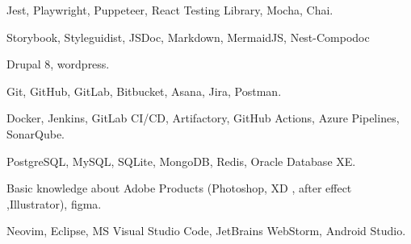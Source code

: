 
\begin{cvparagraph}
  Jest,
  Playwright,
  Puppeteer,
  React Testing Library,
  Mocha,
  Chai.
\end{cvparagraph}


\begin{cvparagraph}
  Storybook,
  Styleguidist,
  JSDoc,
  Markdown,
  MermaidJS,
  Nest-Compodoc
\end{cvparagraph}


\begin{cvparagraph}
  Drupal 8,
  wordpress.
\end{cvparagraph}


\begin{cvparagraph}
  Git,
  GitHub,
  GitLab,
  Bitbucket,
  Asana,
  Jira,
  Postman.
\end{cvparagraph}


\begin{cvparagraph}
  Docker,
  Jenkins,
  GitLab CI/CD,
  Artifactory,
  GitHub Actions,
  Azure Pipelines,
  SonarQube.
\end{cvparagraph}


\begin{cvparagraph}
  PostgreSQL,
  MySQL,
  SQLite,
  MongoDB,
  Redis,
  Oracle Database XE.
\end{cvparagraph}


\begin{cvparagraph}
  Basic knowledge about Adobe Products
  (Photoshop, XD , after effect ,Illustrator),
   figma.
\end{cvparagraph}


\begin{cvparagraph}
  Neovim,
  Eclipse,
  MS Visual Studio Code,
  JetBrains WebStorm,
  Android Studio.
\end{cvparagraph}


